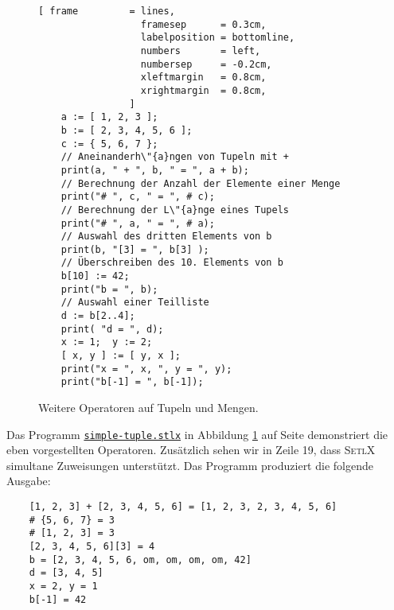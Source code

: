 \begin{figure}[!ht]
  \centering
\begin{Verbatim}[ frame         = lines, 
                  framesep      = 0.3cm, 
                  labelposition = bottomline,
                  numbers       = left,
                  numbersep     = -0.2cm,
                  xleftmargin   = 0.8cm,
                  xrightmargin  = 0.8cm,
                ]
    a := [ 1, 2, 3 ];
    b := [ 2, 3, 4, 5, 6 ];
    c := { 5, 6, 7 };
    // Aneinanderh\"{a}ngen von Tupeln mit +
    print(a, " + ", b, " = ", a + b);
    // Berechnung der Anzahl der Elemente einer Menge
    print("# ", c, " = ", # c);
    // Berechnung der L\"{a}nge eines Tupels
    print("# ", a, " = ", # a);
    // Auswahl des dritten Elements von b
    print(b, "[3] = ", b[3] );
    // Überschreiben des 10. Elements von b
    b[10] := 42;
    print("b = ", b);
    // Auswahl einer Teilliste
    d := b[2..4];
    print( "d = ", d);
    x := 1;  y := 2;
    [ x, y ] := [ y, x ];
    print("x = ", x, ", y = ", y);
    print("b[-1] = ", b[-1]);
\end{Verbatim} 
\vspace*{-0.3cm}
\caption{Weitere Operatoren auf Tupeln und Mengen.}  \label{fig:simple-tuple.stlx}
\end{figure} %

Das Programm 
\href{https://github.com/karlstroetmann/Logik/blob/master/SetlX/simple-tuple.stlx}{\texttt{simple-tuple.stlx}}
in Abbildung \ref{fig:simple-tuple.stlx} auf Seite
\pageref{fig:simple-tuple.stlx} demonstriert die eben vorgestellten Operatoren.  
Zus\"{a}tzlich sehen wir in Zeile 19, dass \textsc{SetlX} simultane Zuweisungen unterst\"{u}tzt.
Das Programm produziert die folgende Ausgabe:
\begin{verbatim}
    [1, 2, 3] + [2, 3, 4, 5, 6] = [1, 2, 3, 2, 3, 4, 5, 6]
    # {5, 6, 7} = 3
    # [1, 2, 3] = 3
    [2, 3, 4, 5, 6][3] = 4
    b = [2, 3, 4, 5, 6, om, om, om, om, 42]
    d = [3, 4, 5]
    x = 2, y = 1
    b[-1] = 42
\end{verbatim}


